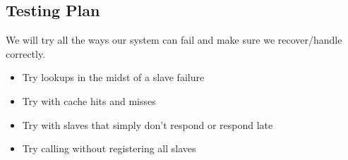 \subsection{Testing Plan}
We will try all the ways our system can fail and make sure we recover/handle correctly.
\begin{itemize}
\item Try lookups in the midst of a slave failure
\item Try with cache hits and misses
\item Try with slaves that simply don't respond or respond late
\item Try calling without registering all slaves
\end{itemize}
